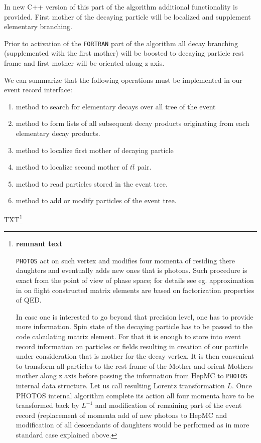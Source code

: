 \documentclass[]{Photos_interface_design}
\begin{document}
In new C++ version of this part of the algorithm additional functionality
is provided.
First mother of the decaying particle will be localized and supplement 
elementary branching. 

Prior to activation
of the {\tt FORTRAN} part of the algorithm all decay branching 
(supplemented with the first 
mother) will be boosted to decaying particle rest frame and first mother
will be oriented along z axis.

We can summarize that the following operations must be implemented
in our event record interface:
\begin{enumerate}
\item method to search for elementary decays over all tree of the event
\item method to form lists of all subsequent decay products originating from each elementary decay products.
\item method to localize first mother of decaying particle 
\item method to localize second mother of $t \bar t$ pair.
\item method to read  particles stored in the event tree.
\item method to add or modify particles of the event tree.
\end{enumerate}

TXT\footnote{ {\bf remnant text}  

{\tt PHOTOS} act on such vertex and modifies four momenta of residing there daughters 
and eventually adds new ones that is photons. 
Such procedure is exact from the point of view of phase space; for details see eg.  approximation in on flight constructed matrix elements are based
on factorization properties of QED. 

In case one is interested to go beyond that precision level, one has to  provide
more information. Spin state of the decaying particle has to be passed to the code calculating matrix element. For that it is enough to store into event record
information on particles or fields resulting in creation of
our particle under consideration that is mother for the decay vertex.
It is then convenient to transform all particles to the rest frame of the Mother
and orient Mothers mother along z axis before passing the information from HepMC to {\tt PHOTOS} internal data structure. Let us call resulting Lorentz transformation $L$. Once PHOTOS internal algorithm complete
its action all four momenta have to be transformed back by $L^{-1}$ and 
modification of remaining part of the event record (replacement of momenta
add of new photons to HepMC and modification of all descendants of 
daughters would be performed as in more standard case explained above.
}
\end{document}
